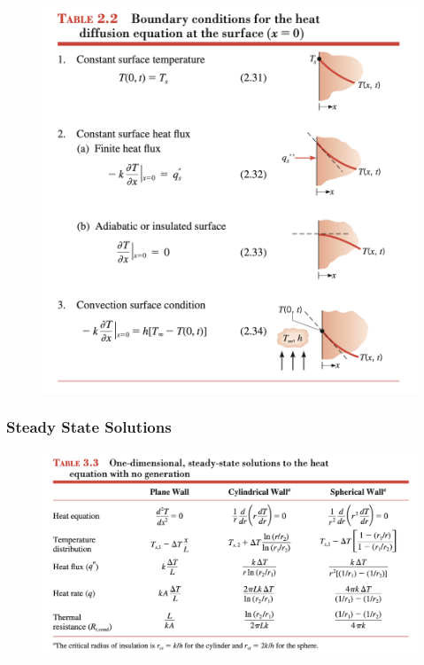 \documentclass[12pt,letterpaper]{article}
\begin{document}
\begin{figure}[!htpb]
    \centering
    \includegraphics[width=0.95\linewidth]{./image21.png}
\end{figure}



\clearpage
\subsubsection*{Steady State Solutions}

\begin{figure}[!htpb]
    \centering
    \includegraphics[width=0.95\linewidth]{./image30.png}
\end{figure}
\end{document}

